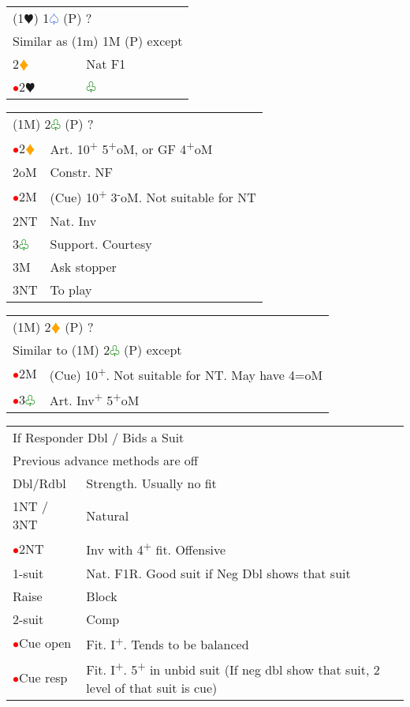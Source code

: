 \documentclass{article}
\renewcommand{\sp}{\textcolor{RoyalBlue}{$\varspade$}}
\newcommand{\he}{\textcolor{RubineRed}{$\varheart$}}
\newcommand{\di}{\textcolor{Orange}{$\vardiamond$}}
\newcommand{\cl}{\textcolor{Green}{$\varclub$}}
\newcommand{\nt}{\relsize{-1}NT\relsize{1}}
\newcommand{\up}{\textsuperscript{+}}
\newcommand{\down}{\textsuperscript{-}}
\newcommand{\al}{\textcolor{red}{$\bullet$}}
\begin{document}
\medskip

\begin{tabular}{|l|p{6.5cm}}
	\multicolumn{2}{l}{(1\he{}) 1\sp{} (P) ? } \\
	\multicolumn{2}{l}{Similar as (1m) 1M (P) except} \\
	2\di{} & Nat F1 \\
	\al{}2\he{} & \cl{} \\
\end{tabular}

\medskip

\begin{tabular}{|l|p{6.5cm}}
	\multicolumn{2}{l}{(1M) 2\cl{} (P) ? } \\
	\al{}2\di{} & Art. 10\up{} 5\up{}oM, or GF 4\up{}oM \\
	2oM & Constr. NF \\
	\al{}2M & (Cue) 10\up{} 3\down{}oM. Not suitable for \nt{} \\
	2\nt{} & Nat. Inv \\
	3\cl{} & Support. Courtesy \\
	3M & Ask stopper \\
	3\nt{} & To play
\end{tabular}

\medskip

\begin{tabular}{|l|p{6.5cm}}
	\multicolumn{2}{l}{(1M) 2\di{} (P) ? } \\
	\multicolumn{2}{l}{Similar to (1M) 2\cl{} (P) except} \\
	\al{}2M & (Cue) 10\up{}. Not suitable for \nt{}. May have 4=oM \\
	\al{}3\cl{} & Art. Inv\up{} 5\up{}oM \\
\end{tabular}

\medskip

\begin{tabular}{|l|p{6.5cm}}
	\multicolumn{2}{l}{If Responder Dbl / Bids a Suit} \\
	\multicolumn{2}{l}{Previous advance methods are off} \\
	Dbl/Rdbl & Strength. Usually no fit \\
	1\nt{} / 3\nt{} & Natural \\
	\al{}2\nt{} & Inv with 4\up{} fit. Offensive \\
	1-suit & Nat. F1R. Good suit if Neg Dbl shows that suit \\
	Raise & Block \\
	2-suit & Comp \\
	\al{}Cue open & Fit. I\up{}. Tends to be balanced \\
	\al{}Cue resp & Fit. I\up{}. 5\up{} in unbid suit (If neg dbl show that suit, 2 level of that suit is cue) \\
\end{tabular}
\end{document}
